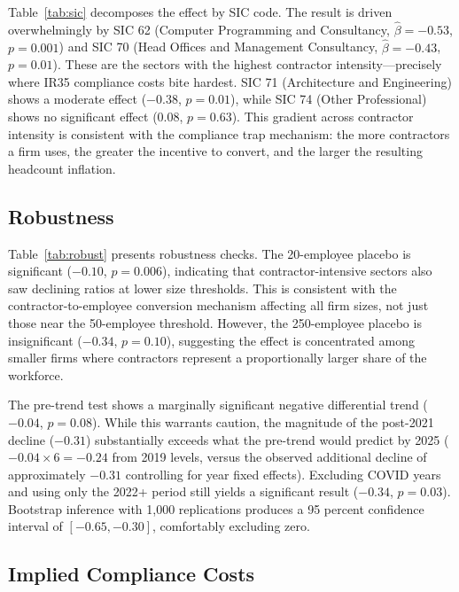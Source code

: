 \documentclass[12pt]{article}
\begin{document}


Table~\ref{tab:sic} decomposes the effect by SIC code. The result is driven overwhelmingly by SIC 62 (Computer Programming and Consultancy, $\hat{\beta} = -0.53$, $p = 0.001$) and SIC 70 (Head Offices and Management Consultancy, $\hat{\beta} = -0.43$, $p = 0.01$). These are the sectors with the highest contractor intensity---precisely where IR35 compliance costs bite hardest. SIC 71 (Architecture and Engineering) shows a moderate effect ($-0.38$, $p = 0.01$), while SIC 74 (Other Professional) shows no significant effect ($0.08$, $p = 0.63$). This gradient across contractor intensity is consistent with the compliance trap mechanism: the more contractors a firm uses, the greater the incentive to convert, and the larger the resulting headcount inflation.

\subsection{Robustness}



Table~\ref{tab:robust} presents robustness checks. The 20-employee placebo is significant ($-0.10$, $p = 0.006$), indicating that contractor-intensive sectors also saw declining ratios at lower size thresholds. This is consistent with the contractor-to-employee conversion mechanism affecting all firm sizes, not just those near the 50-employee threshold. However, the 250-employee placebo is insignificant ($-0.34$, $p = 0.10$), suggesting the effect is concentrated among smaller firms where contractors represent a proportionally larger share of the workforce.

The pre-trend test shows a marginally significant negative differential trend ($-0.04$, $p = 0.08$). While this warrants caution, the magnitude of the post-2021 decline ($-0.31$) substantially exceeds what the pre-trend would predict by 2025 ($-0.04 \times 6 = -0.24$ from 2019 levels, versus the observed additional decline of approximately $-0.31$ controlling for year fixed effects). Excluding COVID years and using only the 2022+ period still yields a significant result ($-0.34$, $p = 0.03$). Bootstrap inference with 1,000 replications produces a 95 percent confidence interval of $[-0.65, -0.30]$, comfortably excluding zero.

\subsection{Implied Compliance Costs}
\end{document}
